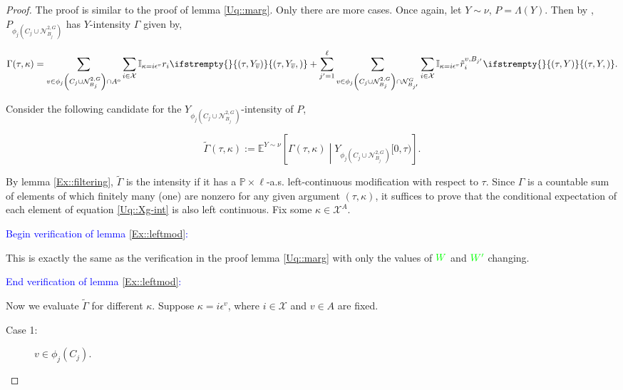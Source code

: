 \documentclass[12pt]{article}
\newcommand{\skipLine}{\vspace{12pt}}
\newcommand{\mb}{\mathbb}
\newcommand{\mc}{\mathcal}
\newcommand{\ov}{\overline}
\newcommand{\ep}{\epsilon}
\newcommand{\tb}{\textcolor{blue}}
\newcommand{\tg}{\textcolor{green}}
\newcommand{\ind}{\hspace{24pt}}
\newcommand{\pr}{\mb{P}}							%
\newcommand{\exmu}[2]{\mb{E}^{#1}\left[#2\right]}	%
\newcommand{\defeq}{:=}								%
\newcommand{\sta}{\mc{X}}							%
\newcommand{\gneigh}[2]{\mc{N}^{#1}_{#2}}			%
\newcommand{\dgneigh}[2]{\mc{N}^{2,#1}_{#2}}		%
\newcommand{\cl}[1]{\ov{#1}}						%
\newcommand{\Sm}{\ell}								%
\newcommand{\rate}{r}								%
\newcommand{\vind}[1]{_{#1}}						%
\newcommand{\tmi}[1]{#1}							%
\newcommand{\stpara}[1]{_{#1}}						%
\newcommand{\psize}{\ell}							%
\newcommand{\tmepro}[3]{
\ifstrempty{#3}{
	\left(#1,#2\right)}{
	\left(#1,#2,#3\right)}}							%
\newcommand{\Xg}{Y}									%
\newcommand{\brate}{\alt{\rate}}					%
\newcommand{\inte}[1]{{#1}^\mathrm{o}}				%
\newcommand{\alt}[1]{\tilde{#1}}					%
\newcommand{\pmap}{\Lambda}							%
\newcommand{\rt}{\tau}								%
\renewcommand{\mark}{\kappa}						%
\newcommand{\ratee}{\Gamma}							%
\newcommand{\cratee}{\alt{\ratee}}					%
\newcommand{\rp}{P}									%
\newcommand{\mm}{\nu}								%
\newcommand{\ev}[1]{\ep^{#1}}						%
\newcommand{\vjpara}[2]{^{#1,#2}}					%
\begin{document}
\begin{proof}
The proof is similar to the proof of lemma \ref{Uq::marg}. Only there are more cases. Once again, let \(\Xg \sim \mm\), \(\rp = \pmap(\Xg)\). Then by \cite[Exercise 14.7.1]{DalVer08}, \(\rp\vind{\phi_j\left(C_j\cup\dgneigh{G}{B_j}\right)}\) has \(\Xg\)-intensity \(\ratee\) given by,

\begin{equation}
\ratee(\rt,\mark) = \sum_{v \in\phi_j\left(C_j\cup\dgneigh{G}{B_j}\right)\cap\inte{A}} \sum_{i \in \sta} \mb{I}_{\mark = i\ev{v}} \rate\stpara{i}\tmepro{\rt}{\Xg\vind{\cl{v}}}{} + \sum_{j' = 1}^\psize\sum_{v \in \phi_j\left(C_j\cup\dgneigh{G}{B_j}\right)\cap\gneigh{G}{B_{j'}}}\sum_{i\in \sta} \mb{I}_{\mark = i\ev{v}} \brate\vjpara{v}{B_{j'}}\stpara{i}\tmepro{\rt}{\Xg}{}.
\label{Uq::Xg-int2}
\end{equation}

Consider the following candidate for the \(\Xg\vind{\phi_j\left(C_j\cup\dgneigh{G}{B_j}\right)}\)-intensity of \(\rp\), 

\[\cratee(\rt,\mark) \defeq \exmu{\Xg \sim \mm}{\ratee(\rt,\mark)\middle|\Xg\vind{\phi_j\left(C_j\cup\dgneigh{G}{B_j}\right)}\tmi{[0,\rt)}}.\]

By lemma \ref{Ex::filtering}, \(\cratee\) is the intensity if it has a \(\pr\times\Sm\)-a.s. left-continuous modification with respect to \(\rt\). Since \(\ratee\) is a countable sum of elements of which finitely many (one) are nonzero for any given argument \((\rt,\mark)\), it suffices to prove that the conditional expectation of each element of equation \eqref{Uq::Xg-int} is also left continuous. Fix some \(\mark \in \sta^A\).

\skipLine

\tb{Begin verification of lemma \ref{Ex::leftmod}:}

\skipLine

This is exactly the same as the verification in the proof lemma \ref{Uq::marg} with only the values of \(\tg{W}\) and \(\tg{W'}\) changing.

\skipLine

\tb{End verification of lemma \ref{Ex::leftmod}:}

\skipLine

\ind Now we evaluate \(\cratee\) for different \(\kappa\). Suppose \(\kappa = i\ev{v}\), where \(i \in \sta\) and \(v\in A\) are fixed.

\begin{description}
\item[Case 1: ] \(v \in \phi_j(C_j)\).


\end{description}
\end{proof}
\end{document}
